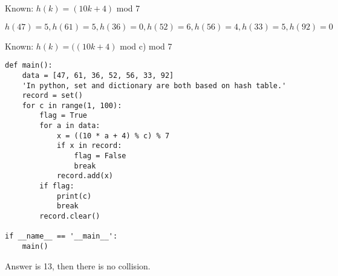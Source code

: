 \documentclass[12pt,twoside]{article}
\begin{document}


\begin{problems}

\problem  %

\begin{problemparts}
\problempart %
Known: $h(k)=(10k+4)$ mod 7

$h(47)=5, h(61)=5,h(36)=0,h(52)=6,h(56)=4,h(33)=5,h(92)=0$

\begin{center}
\end{center}

\newpage
\problempart %
Known: $h(k)=((10k+4)$ mod c) mod 7
\begin{lstlisting}
def main():
    data = [47, 61, 36, 52, 56, 33, 92]
    'In python, set and dictionary are both based on hash table.'
    record = set()
    for c in range(1, 100):
        flag = True
        for a in data:
            x = ((10 * a + 4) % c) % 7
            if x in record:
                flag = False
                break
            record.add(x)
        if flag:
            print(c)
            break
        record.clear()

if __name__ == '__main__':
    main()
\end{lstlisting}
Answer is 13, then there is no collision.


\end{problemparts}
\end{problems}
\end{document}
